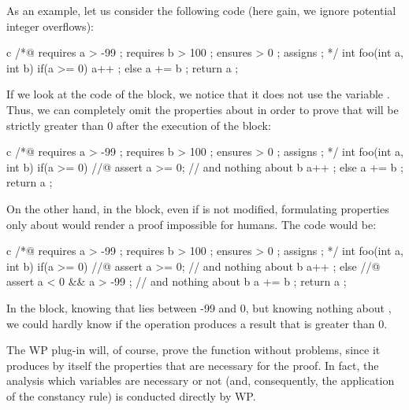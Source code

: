 As an example, let us consider the following code (here gain, we ignore
potential integer overflows):



\begin{CodeBlock}{c}
/*@
  requires a > -99 ;
  requires b > 100 ;
  ensures  \result > 0 ;
  assigns  \nothing ;
*/
int foo(int a, int b){
  if(a >= 0){
    a++ ;
  } else {
    a += b ;
  }
  return a ;
}
\end{CodeBlock}


If we look at the code of the  block, we notice that it does
not use the variable . Thus, we can completely omit the
properties about  in order to prove that  will be
strictly greater than 0 after the execution of the block:



\begin{CodeBlock}{c}
/*@
  requires a > -99 ;
  requires b > 100 ;
  ensures  \result > 0 ;
  assigns  \nothing ;
*/
int foo(int a, int b){
  if(a >= 0){
    //@ assert a >= 0; // and nothing about b
    a++ ;
  } else {
    a += b ;
  }
  return a ;
}
\end{CodeBlock}



On the other hand, in the  block, even if  is
not modified, formulating properties only about  would render
a proof impossible for humans. The code would be:



\begin{CodeBlock}{c}
/*@
  requires a > -99 ;
  requires b > 100 ;
  ensures  \result > 0 ;
  assigns  \nothing ;
*/
int foo(int a, int b){
  if(a >= 0){
    //@ assert a >= 0; // and nothing about b
    a++ ;
  } else {
    //@ assert a < 0 && a > -99 ; // and nothing about b
    a += b ;
  }
  return a ;
}
\end{CodeBlock}



In the  block, knowing that lies between -99 and
0, but knowing nothing about , we could hardly know if the
operation  produces a result that is greater than 0.

The WP plug-in will, of course, prove the function without problems,
since it produces by itself the properties that are necessary for the
proof. In fact, the analysis which variables are necessary or not (and,
consequently, the application of the constancy rule) is conducted
directly by WP.

